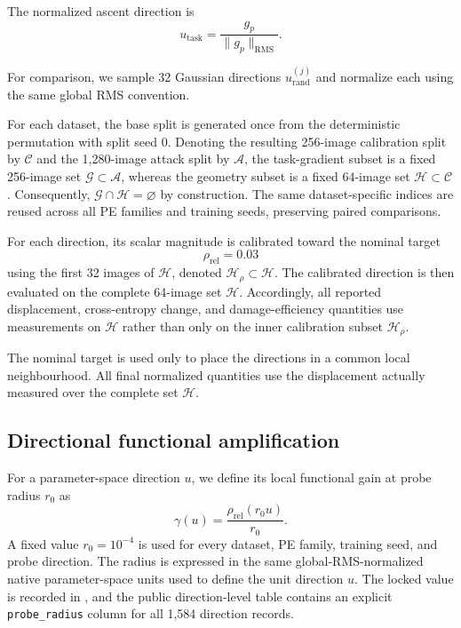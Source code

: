 \documentclass[preprint,12pt,authoryear]{elsarticle}
\begin{document}
The normalized ascent direction is
\begin{equation}
u_{\mathrm{task}}
=
\frac{g_p}{\|g_p\|_{\mathrm{RMS}}}.
\label{eq:task-direction}
\end{equation}

For comparison, we sample 32 Gaussian directions
$u_{\mathrm{rand}}^{(j)}$ and normalize each using the same global RMS
convention.

For each dataset, the base split is generated once from the
deterministic permutation with split seed 0. Denoting the resulting
256-image calibration split by $\mathcal{C}$ and the 1,280-image attack
split by $\mathcal{A}$, the task-gradient subset is a fixed 256-image
set $\mathcal{G}\subset\mathcal{A}$, whereas the geometry subset is a
fixed 64-image set $\mathcal{H}\subset\mathcal{C}$. Consequently,
$\mathcal{G}\cap\mathcal{H}=\varnothing$ by construction. The same
dataset-specific indices are reused across all PE families and
training seeds, preserving paired comparisons.

For each direction, its scalar magnitude is calibrated toward the
nominal target
\[
\rho_{\mathrm{rel}}=0.03
\]
using the first 32 images of $\mathcal{H}$, denoted
$\mathcal{H}_{\rho}\subset\mathcal{H}$. The calibrated direction is
then evaluated on the complete 64-image set $\mathcal{H}$. Accordingly,
all reported displacement, cross-entropy change, and damage-efficiency
quantities use measurements on $\mathcal{H}$ rather than only on the
inner calibration subset $\mathcal{H}_{\rho}$.

The nominal target is used only to place the directions in a common
local neighbourhood. All final normalized quantities use the
displacement actually measured over the complete set $\mathcal{H}$.


\subsection{Directional functional amplification}

For a parameter-space direction $u$, we define its local functional
gain at probe radius $r_0$ as
\begin{equation}
\gamma(u)
=
\frac{
\rho_{\mathrm{rel}}(r_0u)
}{
r_0
}.
\label{eq:functional-gain}
\end{equation}
A fixed value $r_0=10^{-4}$ is used for every dataset, PE family,
training seed, and probe direction. The radius is expressed in the same
global-RMS-normalized native parameter-space units used to define the unit
direction $u$. The locked value is recorded in
,
and the public direction-level table contains an explicit
\texttt{probe\_radius} column for all 1,584 direction records.
\end{document}
